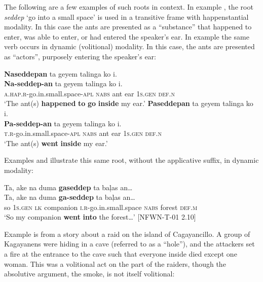 The following are a few examples of such roots in context. In example , the root \textit{seddep} ‘go into a small space’ is used in a transitive frame with happenstantial modality. In this case the ants are presented as a “substance” that happened to enter, was able to enter, or had entered the speaker’s ear. In example  the same verb occurs in dynamic (volitional) modality. In this case, the ants are presented as “actors”, purposely entering the speaker’s ear:

\ea
\label{bkm:Ref148966154}
\textbf{Naseddepan}  ta  geyem  talinga  ko  i. \\\smallskip
\gll \textbf{Na-seddep-an}  ta  geyem  talinga  ko  i. \\
\textsc{a.hap.r}-go.in.small.space-\textsc{apl}  \textsc{nabs}  ant  ear  1\textsc{s.gen}  \textsc{def.n} \\
\glt ‘The ant(s) \textbf{happened} \textbf{to} \textbf{go} \textbf{inside} my ear.’ 
\z
\ea
\label{bkm:Ref148966156}
\textbf{Paseddepan}  ta  geyem  talinga  ko  i. \\\smallskip
\gll \textbf{Pa-seddep-an}  ta  geyem  talinga  ko  i. \\
\textsc{t.r}-go.in.small.space-\textsc{apl}  \textsc{nabs}  ant  ear  1\textsc{s.gen}  \textsc{def.n} \\
\glt ‘The ant(s) \textbf{went} \textbf{inside} my ear.’ 
\z

Examples  and  illustrate this same root, without the applicative suffix, in dynamic modality:

\ea
\label{bkm:Ref148966256}
Ta,  ake  na  duma  \textbf{gaseddep}  ta  baļas  an… \\\smallskip
\gll Ta,  ake  na  duma  \textbf{ga-seddep}  ta  baļas  an… \\
so  1\textsc{s.gen}  \textsc{lk}  companion  \textsc{i.r}-go.in.small.space  \textsc{nabs}  forest  \textsc{def.m} \\
\glt ‘So my companion \textbf{went} \textbf{into} the forest…’ [NFWN-T-01 2.10]
\z

Example  is from a story about a raid on the island of Cagayancillo. A group of Kagayanens were hiding in a cave (referred to as a “hole”), and the attackers set a fire at the entrance to the cave such that everyone inside died except one woman. This was a volitional act on the part of the raiders, though the absolutive argument, the smoke, is not itself volitional:


